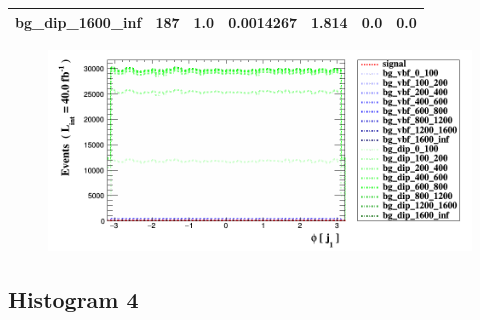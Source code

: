 \documentclass[a4paper, 10pt]{article}
\begin{document}
\begin{table}[H]
\begin{center}
\begin{tabular}{|m{23.0mm}|m{23.0mm}|m{18.0mm}|m{19.0mm}|m{19.0mm}|m{19.0mm}|m{19.0mm}|}
      \hline
      {\cellcolor{white}         bg\_dip\_1600\_inf}& {\cellcolor{white}         187}& {\cellcolor{white}         1.0}& {\cellcolor{white}         0.0014267}& {\cellcolor{white}         1.814}& {\cellcolor{green}         0.0}& {\cellcolor{green}         0.0}\\
\hline
    \end{tabular}
  \end{center}
\end{table}

\begin{figure}[H]
  \begin{center}
    \includegraphics[scale=0.45]{selection_2.png}\\
\caption{   }
  \end{center}
\end{figure}
      \newpage
\subsection{ Histogram 4}
\end{document}
